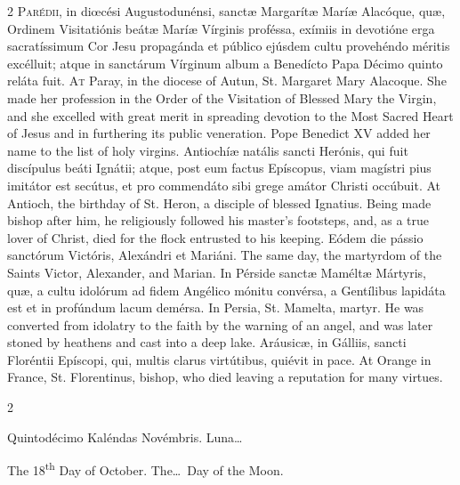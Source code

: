\begin{paracol}{2}
\lettrine[lines=2]{P}{arédii,} in diœcési 
 Augustodunénsi, sanctæ Margarítæ Maríæ Alacóque, quæ, Ordinem Visitatiónis 
 beátæ Maríæ Vírginis proféssa, exímiis in devotióne erga sacratíssimum Cor 
 Jesu propagánda et público ejúsdem cultu provehéndo méritis excélluit; 
 atque in sanctárum Vírginum album a Benedícto Papa Décimo quinto reláta fuit.
\switchcolumn
{}
\lettrine[lines=2]{A}{t} Paray, in the diocese of Autun, 
 St. Margaret Mary Alacoque. She made her profession in the Order of 
 the Visitation of Blessed Mary the Virgin, and she excelled with great merit 
 in spreading devotion to the Most Sacred Heart of Jesus and in furthering 
 its public veneration. Pope Benedict XV added her name to the list of 
 holy virgins.
\switchcolumn*
{}
Antiochíæ natális 
 sancti Herónis, qui fuit discípulus beáti Ignátii; atque, post eum factus 
 Epíscopus, viam magístri pius imitátor est secútus, et pro commendáto sibi 
 grege amátor Christi occúbuit.
\switchcolumn
{}
At Antioch, the birthday of St. 
 Heron, a disciple of blessed Ignatius. Being made bishop after him, he 
 religiously followed his master's footsteps, and, as a true lover of Christ, 
 died for the flock entrusted to his keeping.
\switchcolumn*
{}
Eódem die pássio 
 sanctórum Victóris, Alexándri et Mariáni.
\switchcolumn
{}
The same day, the martyrdom of the 
 Saints Victor, Alexander, and Marian.
\switchcolumn*
{}
In Pérside sanctæ 
 Maméltæ Mártyris, quæ, a cultu idolórum ad fidem Angélico mónitu convérsa, a 
 Gentílibus lapidáta est et in profúndum lacum demérsa.
\switchcolumn
{}
In Persia, St. Mamelta, martyr. 
 He was converted from idolatry to the faith by the warning of an angel, and 
 was later stoned by heathens and cast into a deep lake.
\switchcolumn*
{}
Aráusicæ, in Gálliis, 
 sancti Floréntii Epíscopi, qui, multis clarus virtútibus, quiévit in pace.
\switchcolumn
{}
At Orange in France, St. Florentinus, 
 bishop, who died leaving a reputation for many virtues.
\switchcolumn*
{}
\end{paracol}


\begin{paracol}{2}
\begin{center}{\color{gregoriocolor} Quintodécimo Kaléndas Novémbris. 
 Luna\dots\ }\end{center}
\switchcolumn
{}
\begin{center}{\color{gregoriocolor} The   18\textsuperscript{th} Day of 
 October. The\dots\ Day of the Moon.}\end{center}
\end{paracol}

